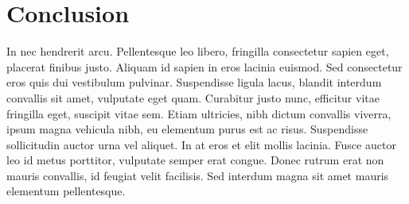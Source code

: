 \documentclass[UTF8]{ctexart}
\begin{document}
\section{Conclusion}
\label{sec:conc}

In nec hendrerit arcu. Pellentesque leo libero, fringilla consectetur sapien eget, placerat finibus justo. Aliquam id sapien in eros lacinia euismod. Sed consectetur eros quis dui vestibulum pulvinar. Suspendisse ligula lacus, blandit interdum convallis sit amet, vulputate eget quam. Curabitur justo nunc, efficitur vitae fringilla eget, suscipit vitae sem. Etiam ultricies, nibh dictum convallis viverra, ipsum magna vehicula nibh, eu elementum purus est ac risus. Suspendisse sollicitudin auctor urna vel aliquet. In at eros et elit mollis lacinia. Fusce auctor leo id metus porttitor, vulputate semper erat congue. Donec rutrum erat non mauris convallis, id feugiat velit facilisis. Sed interdum magna sit amet mauris elementum pellentesque.
\end{document}
